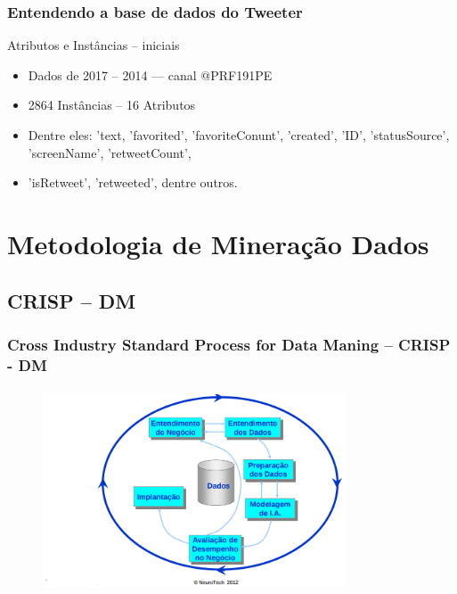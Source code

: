 \documentclass[11pt]{beamer}
\begin{document}
\begin{frame}\frametitle{ Entendendo a base de dados do Tweeter}
\begin{exampleblock}{Atributos e Instâncias -- iniciais}
	\begin{itemize}
		\item Dados de 2017 -- 2014 --- canal @PRF191PE
		\pause
		\item 2864 Instâncias -- 16 Atributos
		\pause
		\item Dentre eles: 'text, 'favorited', 'favoriteConunt', 'created', 'ID', 'statusSource', 'screenName', 'retweetCount',
		\pause
		\item 'isRetweet', 'retweeted', dentre outros.
			
	\end{itemize}
\end{exampleblock}
\end{frame}

\section{ Metodologia de Mineração Dados}
\subsection*{ CRISP -- DM}

\begin{frame}\frametitle{ Cross Industry Standard Process for Data Maning -- CRISP - DM}
	\begin{figure}[!ht]
		\includegraphics[width=90mm, height=60mm]{Figuras/BigData/CrispDM.png}
	\end{figure}
\end{frame}
\end{document}

